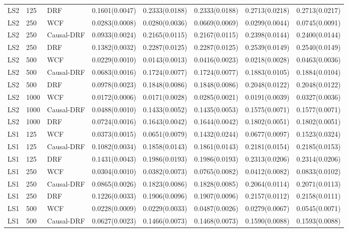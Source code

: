 \begin{longtable}{lllrrrrr}
LS2 & 125 & DRF & 0.1601(0.0047) & 0.2333(0.0188) & 0.2333(0.0188) & 0.2713(0.0218) & 0.2713(0.0217) \\
\addlinespace
LS2 & 250 & WCF & 0.0283(0.0008) & 0.0280(0.0036) & 0.0669(0.0069) & 0.0299(0.0044) & 0.0745(0.0091) \\
LS2 & 250 & Causal-DRF & 0.0933(0.0024) & 0.2165(0.0115) & 0.2167(0.0115) & 0.2398(0.0144) & 0.2400(0.0144) \\
LS2 & 250 & DRF & 0.1382(0.0032) & 0.2287(0.0125) & 0.2287(0.0125) & 0.2539(0.0149) & 0.2540(0.0149) \\
\addlinespace
LS2 & 500 & WCF & 0.0229(0.0010) & 0.0143(0.0013) & 0.0416(0.0023) & 0.0218(0.0028) & 0.0463(0.0036) \\
LS2 & 500 & Causal-DRF & 0.0683(0.0016) & 0.1724(0.0077) & 0.1724(0.0077) & 0.1883(0.0105) & 0.1884(0.0104) \\
LS2 & 500 & DRF & 0.0978(0.0023) & 0.1848(0.0086) & 0.1848(0.0086) & 0.2048(0.0122) & 0.2048(0.0122) \\
\addlinespace
LS2 & 1000 & WCF & 0.0172(0.0006) & 0.0171(0.0028) & 0.0285(0.0021) & 0.0191(0.0039) & 0.0327(0.0036) \\
LS2 & 1000 & Causal-DRF & 0.0488(0.0010) & 0.1433(0.0052) & 0.1435(0.0053) & 0.1575(0.0071) & 0.1577(0.0071) \\
LS2 & 1000 & DRF & 0.0724(0.0016) & 0.1643(0.0042) & 0.1644(0.0042) & 0.1802(0.0051) & 0.1802(0.0051) \\
\addlinespace
\midrule
LS1 & 125 & WCF & 0.0373(0.0015) & 0.0651(0.0079) & 0.1432(0.0244) & 0.0677(0.0097) & 0.1523(0.0324) \\
LS1 & 125 & Causal-DRF & 0.1082(0.0034) & 0.1858(0.0143) & 0.1861(0.0143) & 0.2181(0.0154) & 0.2185(0.0153) \\
LS1 & 125 & DRF & 0.1431(0.0043) & 0.1986(0.0193) & 0.1986(0.0193) & 0.2313(0.0206) & 0.2314(0.0206) \\
\addlinespace
LS1 & 250 & WCF & 0.0304(0.0010) & 0.0382(0.0073) & 0.0765(0.0082) & 0.0412(0.0082) & 0.0833(0.0102) \\
LS1 & 250 & Causal-DRF & 0.0865(0.0026) & 0.1823(0.0086) & 0.1828(0.0085) & 0.2064(0.0114) & 0.2071(0.0113) \\
LS1 & 250 & DRF & 0.1226(0.0033) & 0.1906(0.0096) & 0.1907(0.0096) & 0.2157(0.0112) & 0.2158(0.0111) \\
\addlinespace
LS1 & 500 & WCF & 0.0228(0.0009) & 0.0229(0.0033) & 0.0487(0.0026) & 0.0279(0.0067) & 0.0545(0.0071) \\
LS1 & 500 & Causal-DRF & 0.0627(0.0023) & 0.1466(0.0073) & 0.1468(0.0073) & 0.1590(0.0088) & 0.1593(0.0088) \\

\end{longtable}
